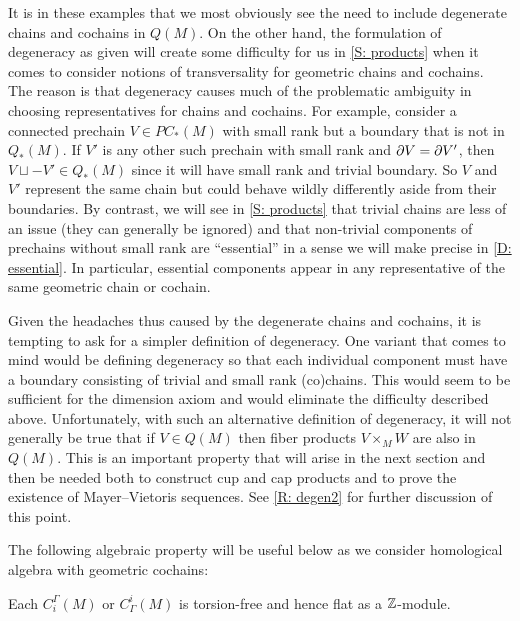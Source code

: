 \begin{remark}\label{R: degen1}
	It is in these examples that we most obviously see the need to include degenerate chains and cochains in $Q(M)$.
	On the other hand, the formulation of degeneracy as given will create some difficulty for us in \cref{S: products} when it comes to consider notions of transversality for geometric chains and cochains.
	The reason is that degeneracy causes much of the problematic ambiguity in choosing representatives for chains and cochains.
	For example, consider a connected prechain $V \in PC_*(M)$ with small rank but a boundary that is not in $Q_*(M)$.
	If $V'$ is any other such prechain with small rank and $\partial V = \partial V'$, then $V \sqcup -V' \in Q_*(M)$ since it will have small rank and trivial boundary.
	So $V$ and $V'$ represent the same chain but could behave wildly differently aside from their boundaries.
	By contrast, we will see in \cref{S: products} that trivial chains are less of an issue (they can generally be ignored) and that non-trivial components of prechains without small rank are ``essential'' in a sense we will make precise in \cref{D: essential}.
	In particular, essential components appear in any representative of the same geometric chain or cochain.

	Given the headaches thus caused by the degenerate chains and cochains, it is tempting to ask for a simpler definition of degeneracy.
	One variant that comes to mind would be defining degeneracy so that each individual component must have a boundary consisting of trivial and small rank (co)chains.
	This would seem to be sufficient for the dimension axiom and would eliminate the difficulty described above.
	Unfortunately, with such an alternative definition of degeneracy, it will not generally be true that if $V \in Q(M)$ then fiber products $V \times_M W$ are also in $Q(M)$.
	This is an important property that will arise in the next section and then be needed both to construct cup and cap products and to prove the existence of Mayer--Vietoris sequences.
	See \cref{R: degen2} for further discussion of this point.
\end{remark}

The following algebraic property will be useful below as we consider homological algebra with geometric cochains:

\begin{lemma}\label{L: flat}
	Each $C_i^\Gamma(M)$ or $C_\Gamma^i(M)$ is torsion-free and hence flat as a $\mathbb{Z}$-module.
\end{lemma}

